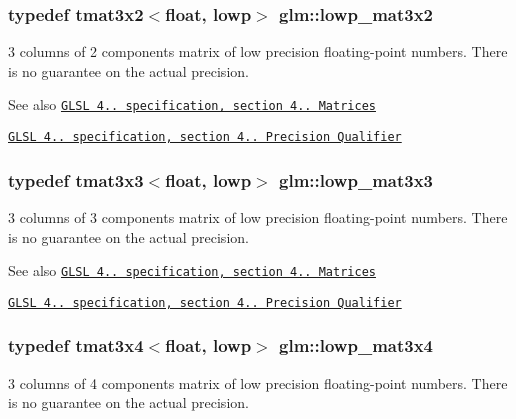 \subsubsection[{lowp\+\_\+mat3x2}]{\setlength{\rightskip}{0pt plus 5cm}typedef tmat3x2$<$float, lowp$>$ {\bf glm\+::lowp\+\_\+mat3x2}}\label{namespaceglm_adeaba732d325eca39068acf99c877b05}
3 columns of 2 components matrix of low precision floating-\/point numbers. There is no guarantee on the actual precision.

\begin{DoxySeeAlso}{See also}
\href{http://www.opengl.org/registry/doc/GLSLangSpec.4.20.8.pdf}{\tt G\+L\+S\+L 4.. specification, section 4.. Matrices} 

\href{http://www.opengl.org/registry/doc/GLSLangSpec.4.20.8.pdf}{\tt G\+L\+S\+L 4.. specification, section 4.. Precision Qualifier} 
\end{DoxySeeAlso}
\hypertarget{namespaceglm_a99ebdf85c702b7f41006d25808798769}{}
\subsubsection[{lowp\+\_\+mat3x3}]{\setlength{\rightskip}{0pt plus 5cm}typedef tmat3x3$<$float, lowp$>$ {\bf glm\+::lowp\+\_\+mat3x3}}\label{namespaceglm_a99ebdf85c702b7f41006d25808798769}
3 columns of 3 components matrix of low precision floating-\/point numbers. There is no guarantee on the actual precision.

\begin{DoxySeeAlso}{See also}
\href{http://www.opengl.org/registry/doc/GLSLangSpec.4.20.8.pdf}{\tt G\+L\+S\+L 4.. specification, section 4.. Matrices} 

\href{http://www.opengl.org/registry/doc/GLSLangSpec.4.20.8.pdf}{\tt G\+L\+S\+L 4.. specification, section 4.. Precision Qualifier} 
\end{DoxySeeAlso}
\hypertarget{namespaceglm_a330f1d9a226fb5640c67e3ec9d485dc0}{}
\subsubsection[{lowp\+\_\+mat3x4}]{\setlength{\rightskip}{0pt plus 5cm}typedef tmat3x4$<$float, lowp$>$ {\bf glm\+::lowp\+\_\+mat3x4}}\label{namespaceglm_a330f1d9a226fb5640c67e3ec9d485dc0}
3 columns of 4 components matrix of low precision floating-\/point numbers. There is no guarantee on the actual precision.

